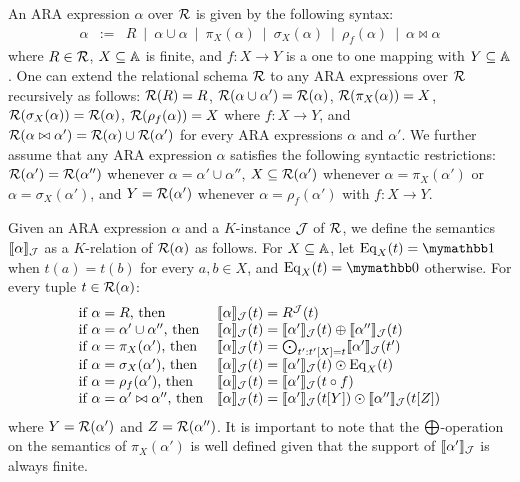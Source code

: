 An ARA expression $\alpha$ over $\mathcal{R}$ is given by the following syntax:
$$
\begin{array}{rcl}
\alpha & := & R \ \mid \ \alpha \cup \alpha \ \mid \  \pi_X(\alpha) \ \mid \  \sigma_X(\alpha) \ \mid \ \rho_f(\alpha) \ \mid \ \alpha \bowtie \alpha
\end{array}
$$
where $R \in \mathcal{R}$, $X \subseteq \mathbb{A}$ is finite, and $f: X \rightarrow Y$ is a one to one mapping with $Y \subseteq \mathbb{A}$. One can extend the relational schema $\mathcal{R}$ to any ARA expressions over $\mathcal{R}$ recursively as follows: $\mathcal{R}(R) = R$, $\mathcal{R}(\alpha \cup \alpha') = \mathcal{R}(\alpha)$, $\mathcal{R}(\pi_X(\alpha)) = X$, $\mathcal{R}(\sigma_X(\alpha)) = \mathcal{R}(\alpha)$, $\mathcal{R}(\rho_f(\alpha)) = X$ where $f:X \rightarrow Y$, and $\mathcal{R}(\alpha \bowtie \alpha') = \mathcal{R}(\alpha) \cup \mathcal{R}(\alpha')$ for every ARA expressions $\alpha$ and $\alpha'$.
We further assume that any ARA expression $\alpha$ satisfies the following syntactic restrictions: $\mathcal{R}(\alpha') = \mathcal{R}(\alpha'')$ whenever $\alpha = \alpha' \cup \alpha''$, $X \subseteq \mathcal{R}(\alpha')$ whenever $\alpha = \pi_X(\alpha')$ or $\alpha = \sigma_X(\alpha')$, and $Y = \mathcal{R}(\alpha')$ whenever $\alpha = \rho_f(\alpha')$ with $f: X \rightarrow Y$.

Given an ARA expression $\alpha$ and a $K$-instance $\mathcal{J}$ of $\mathcal{R}$, we define the semantics $\llbracket \alpha \rrbracket_{\mathcal{J}}$ as a $K$-relation of $\mathcal{R}(\alpha)$ as follows. For $X \subseteq \mathbb{A}$, let $\operatorname{Eq}_X(t) = \kone$ when $t(a) = t(b)$ for every $a, b \in X$, and $\operatorname{Eq}_X(t) = \kzero$ otherwise. For every tuple $t \in \mathcal{R}(\alpha)$:
$$
\begin{array}{ll}
\text{if $\alpha = R$, then} & \llbracket \alpha \rrbracket_{\mathcal{J}}(t) = R^{\mathcal{J}}(t) \\
\text{if $\alpha = \alpha' \cup \alpha''$, then} & \llbracket \alpha \rrbracket_{\mathcal{J}}(t) = \llbracket \alpha' \rrbracket_{\mathcal{J}}(t) \oplus \llbracket \alpha'' \rrbracket_{\mathcal{J}}(t)  \\
\text{if $\alpha = \pi_X(\alpha')$, then} & \llbracket \alpha \rrbracket_{\mathcal{J}}(t) = \bigodot_{t': t'[X] = t} \llbracket \alpha' \rrbracket_{\mathcal{J}}(t') \\
\text{if $\alpha = \sigma_X(\alpha')$, then} & \llbracket \alpha \rrbracket_{\mathcal{J}}(t) = 
\llbracket \alpha' \rrbracket_{\mathcal{J}}(t) \odot \operatorname{Eq}_X(t)  \\
\text{if $\alpha = \rho_f(\alpha')$, then} & \llbracket \alpha \rrbracket_{\mathcal{J}}(t) = 
\llbracket \alpha' \rrbracket_{\mathcal{J}}(t \circ f)  
\\
\text{if $\alpha = \alpha' \bowtie \alpha''$, then} & \llbracket \alpha \rrbracket_{\mathcal{J}}(t) =  \llbracket \alpha' \rrbracket_{\mathcal{J}}(t[Y]) \odot  \llbracket \alpha'' \rrbracket_{\mathcal{J}}(t[Z])
\end{array}
$$
where $Y = \mathcal{R}(\alpha')$ and $Z = \mathcal{R}(\alpha'')$. It is important to note that the $\bigoplus$-operation on the semantics of $\pi_X(\alpha')$ is well defined given that the support of $\llbracket \alpha' \rrbracket_{\mathcal{J}}$ is always finite. 

